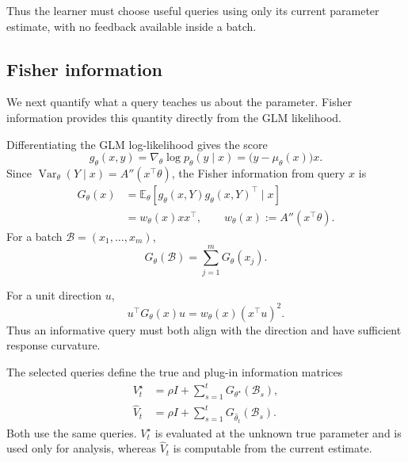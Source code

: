 \documentclass[10pt,twoside,letterpaper]{article}
\newcommand{\E}{\mathbb E}
\newcommand{\thetahat}{\widehat\theta}
\newcommand{\Vhat}{\widehat V}
\begin{document}
Thus the learner must choose useful queries using only its current
parameter estimate, with no feedback available inside a batch.


\subsection{Fisher information}

We next quantify what a query teaches us about the parameter. Fisher
information provides this quantity directly from the GLM likelihood.

Differentiating the GLM log-likelihood gives the score
\begin{equation}
g_\theta(x,y)
=
\nabla_\theta\log p_\theta(y\mid x)
=
\bigl(y-\mu_\theta(x)\bigr)x.
\label{eq:likelihood-score}
\end{equation}
Since
$\operatorname{Var}_\theta(Y\mid x)=A''(x^\top\theta)$,
the Fisher information from query $x$ is
\begin{equation}
\begin{aligned}
G_\theta(x)
&=
\E_\theta[
g_\theta(x,Y)g_\theta(x,Y)^\top
\mid x]\\
&=
w_\theta(x)xx^\top,
\qquad
w_\theta(x):=A''(x^\top\theta).
\end{aligned}
\label{eq:fisher}
\end{equation}
For a batch $\mathcal B=(x_1,\ldots,x_m)$,
\begin{equation}
G_\theta(\mathcal B)
=
\sum_{j=1}^{m}G_\theta(x_j).
\label{eq:batch-fisher}
\end{equation}

For a unit direction $u$,
\begin{equation}
u^\top G_\theta(x)u
=
w_\theta(x)(x^\top u)^2.
\label{eq:directional-information}
\end{equation}
Thus an informative query must both align with the direction and have
sufficient response curvature.

The selected queries define the true and plug-in information matrices
\begin{equation}
\begin{aligned}
V_t^\star
&=
\rho I+
\sum_{s=1}^{t}
G_{\theta^\star}(\mathcal B_s),\\
\Vhat_t
&=
\rho I+
\sum_{s=1}^{t}
G_{\thetahat_t}(\mathcal B_s).
\end{aligned}
\label{eq:states}
\end{equation}
Both use the same queries. $V_t^\star$ is evaluated at the unknown true
parameter and is used only for analysis, whereas $\Vhat_t$ is
computable from the current estimate.
\end{document}
